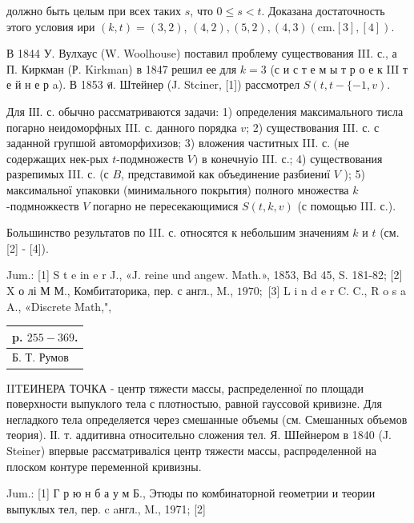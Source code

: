 \documentclass[10pt]{article}
\begin{document}
должно быть целым при всех таких $s$, что $0 \leqslant s<t$. Доказана достаточность этого условия ири $(k, t)=(3,2)$, $(4,2),(5,2),(4,3)(\mathrm{cm} .[3],[4])$.



В 1844 У. Вулхаус (W. Woolhouse) поставил проблему существования III. с., а П. Киркман (Р. Kirkman) в 1847 решил ее для $k=3$ (с и с т е м ы т р о е к III т е й н е р a). В 1853 ศ. Штейнер (J. Stciner, [1]) рассмотрел $S(t, t-\{-1, v)$.



Для ІІІ. с. обычно рассматриваются задачи: 1) определения максимального тисла погарно неидоморфных III. с. данного порядка $v$; 2) существования III. с. с заданной групшой автоморфихизов; 3) вложения частитных III. с. (не содержащих нек-рых $t$-подмножеств $V)$ в конечнуіо III. с.; 4) существования разрепимых III. с. (с $B$, представимой как объединение разбиениї $V$ ); 5) максимальної упаковки (минимального покрытия) полного множества $k$-подмножкеств $V$ погарно не пересекающимися $S(t, k, v)$ (с помощью III. с.).



Большинство результатов по III. с. относятся к небольшим значениям $k$ и $t$ (см. [2] - [4]).



Jum.: [1] S t e in e r J., «J. reine und angew. Math.», 1853, Bd 45, S. 181-82; [2] X о лі М М., Комбитаторика, пер. с англ., M., $1970 ;$ [3] L i n d e r C. C., R o s a A., «Discrete Math,", \begin{tabular}{l}

p. $255-369$. \\

\hline

Б. Т. Румов \\

\hline

\end{tabular}



IITЕИНЕРА ТОЧКА - центр тяжести массы, распределенної по площади поверхности выпуклого тела с плотностыю, равной гауссовой кривизне. Для негладкого тела определяется через смешанные объемы (см. Смешанных объемов теория). ІІ. т. аддитивна относительно сложения тел. Я. ШІейнером в 1840 (J. Steiner) впервые рассматриваліся центр тяжести массы, распрөделенной на плоском контуре переменной кривизны.



Jum.: [1] Г р ю н б а у м Б., Этюды по комбинаторной геометрии и теории выпуклых тел, пер. c aнгл., M., 1971; [2]
\end{document}
